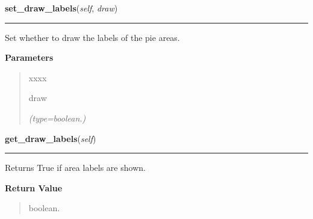     \label{pygtk_chart:pie_chart:PieChart:set_draw_labels}

    \vspace{0.5ex}

\hspace{.8\funcindent}\begin{boxedminipage}{\funcwidth}

    \raggedright \textbf{set\_draw\_labels}(\textit{self}, \textit{draw})

    \vspace{-1.5ex}

    \rule{\textwidth}{0.5\fboxrule}
\setlength{\parskip}{2ex}
    Set whether to draw the labels of the pie areas.

\setlength{\parskip}{1ex}
      \textbf{Parameters}
      \vspace{-1ex}

      \begin{quote}
        \begin{Ventry}{xxxx}

          \item[draw]

            {\it (type=boolean.)}

        \end{Ventry}

      \end{quote}

    \end{boxedminipage}

    \label{pygtk_chart:pie_chart:PieChart:get_draw_labels}

    \vspace{0.5ex}

\hspace{.8\funcindent}\begin{boxedminipage}{\funcwidth}

    \raggedright \textbf{get\_draw\_labels}(\textit{self})

    \vspace{-1.5ex}

    \rule{\textwidth}{0.5\fboxrule}
\setlength{\parskip}{2ex}
    Returns True if area labels are shown.

\setlength{\parskip}{1ex}
      \textbf{Return Value}
    \vspace{-1ex}

      \begin{quote}
      boolean.

      \end{quote}

    \end{boxedminipage}

